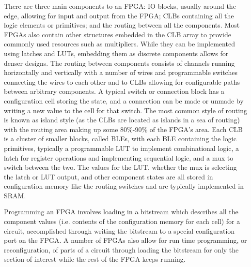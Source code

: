 \documentclass[12pt,final,oneside]{dwThesis} %
\begin{document}
   There are three main components to an \gls{FPGA}: \gls{IO} blocks, usually
   around the edge, allowing for input and output from the \gls{FPGA};
   \glspl{CLB} containing all the logic elements or \glspl{primitive}; and the
   routing between all the components.  Most \glspl{FPGA} also contain other
   structures embedded in the \gls{CLB} array to provide commonly used
   resources such as multipliers. While they can be implemented using latches
   and \glspl{LUT}, embedding them as discrete components allows for denser
   designs.  The routing between components consists of channels running
   horizontally and vertically with a number of wires and programmable switches
   connecting the wires to each other and to \glspl{CLB} allowing for
   configurable paths between arbitrary components. A typical switch or
   connection block has a configuration cell storing the state, and a
   connection can be made or unmade by writing a new value to the cell for that
   switch. The most common style of routing is known as island style (as the
   \glspl{CLB} are located as islands in a sea of routing) with the routing
   area making up some 80\%-90\% of the \gls{FPGA}'s area\cite{FPGAArch}.  Each
   \gls{CLB} is a cluster of smaller blocks, called \glspl{BLE}, with each
   \gls{BLE} containing the logic primitives, typically a programmable
   \gls{LUT} to implement combinational logic, a latch for register operations
   and implementing sequential logic, and a \gls{mux} to switch between the
   two. The values for the \gls{LUT}, whether the \gls{mux} is selecting the
   latch or \gls{LUT} output, and other component states are all stored in
   configuration memory like the routing switches and are typically implemented
   in \gls{SRAM}.

   Programming an \gls{FPGA} involves loading in a bitstream which describes
   all the component values (i.e. contents of the configuration memory for each
   cell) for a circuit, accomplished through writing the bitstream to a special
   configuration port on the \gls{FPGA}. A number of \glspl{FPGA} also allow
   for run time programming, or reconfiguration, of parts of a circuit through
   loading the bitstream for only the section of interest while the rest of the
   \gls{FPGA} keeps running.
\end{document}
